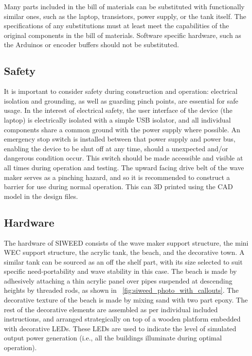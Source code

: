\documentclass[hardware,article,submit,pdftex,moreauthors]{Definitions/mdpi}
\begin{document}
Many parts included in the bill of materials can be substituted with functionally similar ones, such as the laptop, transistors, power supply, or the tank itself.
The specifications of any substitutions must at least meet the capabilities of the original components in the bill of materials.
Software specific hardware, such as the Arduinos or encoder buffers should not be substituted. 

\subsection{Safety}
It is important to consider safety during construction and operation: electrical isolation and grounding, as well as guarding pinch points, are essential for safe usage.
In the interest of electrical safety, the user interface of the device (the laptop) is electrically isolated with a simple USB isolator, and all individual components share a common ground with the power supply where possible. 
An emergency stop switch is installed between that power supply and power bus, enabling the device to be shut off at any time, should a unexpected and/or dangerous condition occur.
This switch should be made accessible and visible at all times during operation and testing.
The upward facing drive belt of the wave maker serves as a pinching hazard, and so it is recommended to construct a barrier for use during normal operation.
This can 3D printed using the CAD model in the design files.

\subsection{Hardware}
The hardware of SIWEED consists of the wave maker support structure, the mini WEC support structure, the acrylic tank, the beach, and the decorative town. 
A similar tank can be sourced as an off the shelf part, with its size selected to suit specific need-portability and wave stability in this case. 
The beach is made by adhesively attaching a thin acrylic panel over pipes suspended at descending heights by threaded rods, as shown in \figurename~\ref{fig:siweed_photo_with_callouts}.
The decorative texture of the beach is made by mixing sand with two part epoxy.
The rest of the decorative elements are assembled as per individual included instructions, and arranged strategically on top of a wooden platform embedded with decorative LEDs. 
These LEDs are used to indicate the level of simulated output power generation (i.e., all the buildings illuminate during optimal operation).
\end{document}
